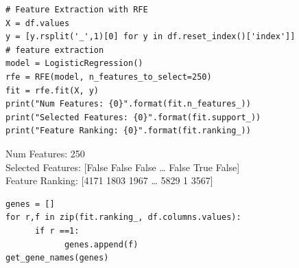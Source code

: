 \documentclass[11pt]{article}
\begin{document}
\begin{verbatim}
# Feature Extraction with RFE
X = df.values
y = [y.rsplit('_',1)[0] for y in df.reset_index()['index']]
# feature extraction
model = LogisticRegression()
rfe = RFE(model, n_features_to_select=250)
fit = rfe.fit(X, y)
print("Num Features: {0}".format(fit.n_features_))
print("Selected Features: {0}".format(fit.support_))
print("Feature Ranking: {0}".format(fit.ranking_))
\end{verbatim}

Num Features: 250\\
Selected Features: [False False False \ldots{} False  True False]\\
Feature Ranking: [4171 1803 1967 \ldots{} 5829    1 3567]\\


\begin{verbatim}
genes = []
for r,f in zip(fit.ranking_, df.columns.values):
      if r ==1:
            genes.append(f)
get_gene_names(genes)
\end{verbatim}
\end{document}
